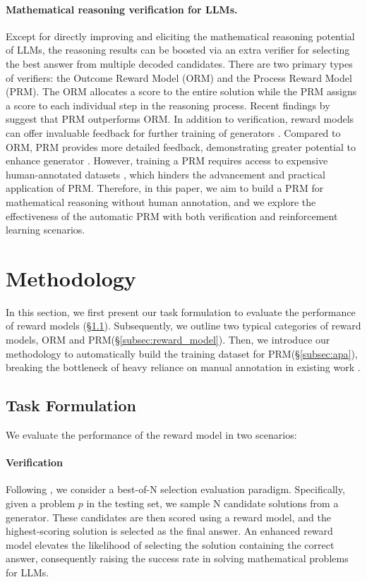 \documentclass{article} %
\begin{document}
\paragraph{Mathematical reasoning verification for LLMs.} Except for directly improving and eliciting the mathematical reasoning potential of LLMs, 
the reasoning results can be boosted via an extra verifier for selecting the best answer from multiple decoded candidates.
There are two primary types of verifiers: the Outcome Reward Model (ORM) and the Process Reward Model (PRM). The ORM allocates a score to the entire solution while the PRM assigns a score to each individual step in the reasoning process.
Recent findings by \citep{lightman2023let} suggest that PRM outperforms ORM.
In addition to verification, reward models can offer invaluable feedback for further training of generators \citep{uesato2022solving,pan2023let}.
Compared to ORM, PRM provides more detailed feedback, demonstrating greater potential to enhance generator \citep{wu2023fine}. 
However, training a PRM requires access to expensive human-annotated datasets \citep{uesato2022solving,lightman2023let}, which hinders the advancement and practical application of PRM.
Therefore, in this paper, we aim to build a PRM for mathematical reasoning without human annotation, and we explore the effectiveness of the automatic PRM with both verification and reinforcement learning scenarios.



\section{Methodology}
In this section, we first present our task formulation to evaluate the performance of reward models (\S\ref{subsec:task_formulation}).
Subsequently, we outline two typical categories of reward models, ORM and PRM(\S\ref{subsec:reward_model}).
Then, we introduce our methodology to automatically build the training dataset for PRM(\S\ref{subsec:apa}), breaking the bottleneck of heavy reliance on manual annotation in existing
work \citep{uesato2022solving,lightman2023let}.

\subsection{Task Formulation}
\label{subsec:task_formulation}
We evaluate the performance of the reward model in two scenarios:
\paragraph{Verification} Following \citep{lightman2023let}, we consider a best-of-N selection evaluation paradigm.
Specifically, given a problem $p$ in the testing set, we sample N candidate solutions from a generator. These candidates are then scored using a reward model, and the highest-scoring solution is selected as the final answer. 
An enhanced reward model elevates the likelihood of selecting the solution containing the correct answer, consequently raising the success rate in solving mathematical problems for LLMs.
\end{document}
